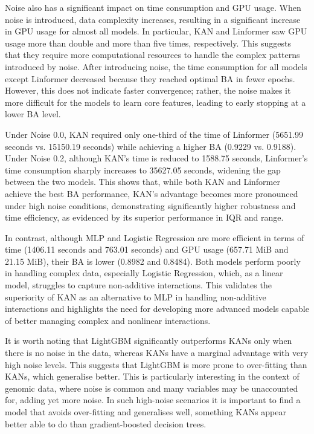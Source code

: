 \documentclass{article}
\begin{document}
Noise also has a significant impact on time consumption and GPU usage. When noise is introduced, data complexity increases, resulting in a significant increase in GPU usage for almost all models. In particular, KAN and Linformer saw GPU usage more than double and more than five times, respectively. This suggests that they require more computational resources to handle the complex patterns introduced by noise. After introducing noise, the time consumption for all models except Linformer decreased because they reached optimal BA in fewer epochs. However, this does not indicate faster convergence; rather, the noise makes it more difficult for the models to learn core features, leading to early stopping at a lower BA level.

Under Noise 0.0, KAN required only one-third of the time of Linformer (5651.99 seconds vs. 15150.19 seconds) while achieving a higher BA (0.9229 vs. 0.9188). Under Noise 0.2, although KAN's time is reduced to 1588.75 seconds, Linformer's time consumption sharply increases to 35627.05 seconds, widening the gap between the two models. This shows that, while both KAN and Linformer achieve the best BA performance, KAN's advantage becomes more pronounced under high noise conditions, demonstrating significantly higher robustness and time efficiency, as evidenced by its superior performance in IQR and range. 

In contrast, although MLP and Logistic Regression are more efficient in terms of time (1406.11 seconds and 763.01 seconds) and GPU usage (657.71 MiB and 21.15 MiB), their BA is lower (0.8982 and 0.8484). Both models perform poorly in handling complex data, especially Logistic Regression, which, as a linear model, struggles to capture non-additive interactions. This validates the superiority of KAN as an alternative to MLP in handling non-additive interactions and highlights the need for developing more advanced models capable of better managing complex and nonlinear interactions.

It is worth noting that LightGBM significantly outperforms KANs only when there is no noise in the data, whereas KANs have a marginal advantage with very high noise levels.
This suggests that LightGBM is more prone to over-fitting than KANs, which generalise better.
This is particularly interesting in the context of genomic data, where noise is common and many variables may be unaccounted for, adding yet more noise.
In such high-noise scenarios it is important to find a model that avoids over-fitting and generalises well, something KANs appear better able to do than gradient-boosted decision trees.
\end{document}
